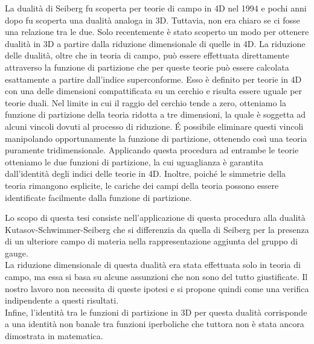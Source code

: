 \documentclass[a4paper,oneside,11pt]{article}
\begin{document}
La dualità di Seiberg fu scoperta per teorie di campo in 4D nel 1994 e pochi anni dopo fu scoperta una dualità analoga in 3D.
Tuttavia, non era chiaro se ci fosse una relazione tra le due.
Solo recentemente è stato scoperto un modo per ottenere dualità in 3D a partire dalla riduzione dimensionale di quelle in 4D.
La riduzione delle dualità, oltre che in teoria di campo, può essere effettuata direttamente attraverso la funzione di partizione che per queste teorie può essere calcolata esattamente a partire dall'indice superconforme.
Esso è definito per teorie in 4D con una delle dimensioni compattificata su un cerchio e risulta essere uguale per teorie duali.
Nel limite in cui il raggio del cerchio tende a zero, otteniamo la funzione di partizione della teoria ridotta a tre dimensioni, la quale è soggetta ad alcuni vincoli dovuti al processo di riduzione.
\'E possibile eliminare questi vincoli manipolando opportunamente la funzione di partizione, ottenendo così una teoria puramente tridimensionale. 
Applicando questa procedura ad entrambe le teorie otteniamo le due funzioni di partizione, la cui uguaglianza è garantita dall'identità degli indici delle teorie in 4D.
Inoltre, poiché le simmetrie della teoria rimangono esplicite, le cariche dei campi della teoria possono essere identificate facilmente dalla funzione di partizione.

Lo scopo di questa tesi consiste nell'applicazione di questa procedura alla dualità Kutasov-Schwimmer-Seiberg che si differenzia da quella di Seiberg per la presenza di un ulteriore campo di materia nella rappresentazione aggiunta del gruppo di gauge. \\
La riduzione dimensionale di questa dualità era stata effettuata solo in teoria di campo, ma essa si basa su alcune assunzioni che non sono del tutto giustificate.
Il nostro lavoro non necessita di queste ipotesi e si propone quindi come una verifica indipendente a questi risultati.
\\
Infine, l'identità tra le funzioni di partizione in 3D per questa dualità corrisponde a una identità non banale tra funzioni iperboliche che tuttora non è stata ancora dimostrata in matematica.
\end{document}
